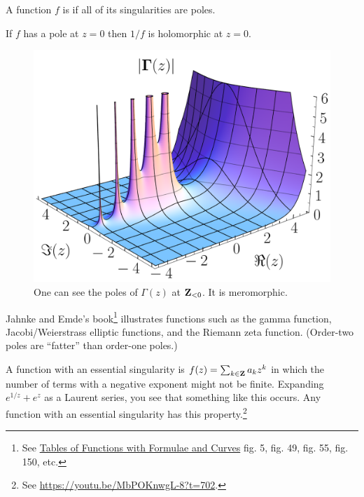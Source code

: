 \documentclass[11pt, oneside,margin=1in]{article}
\begin{document}
\begin{definition}[ ]\label{}\text{}
        A function $f$ is  if all of its singularities are poles.
\end{definition}

If $f$ has a pole at $z=0$ then $1/f$ is holomorphic at $z=0$.

\begin{figure}
	\begin{center}
		\includegraphics[scale=0.2]{abs_gamma}
		\caption{One can see the poles of $\Gamma(z)$ at $\mathbf Z_{<0}$. It is meromorphic.}
	\end{center}
\end{figure}

Jahnke and Emde's book\footnote{See \underline{Tables of Functions with Formulae and Curves} fig. 5, fig. 49, fig. 55, fig. 150, etc.} illustrates functions such as the gamma function, Jacobi/Weierstrass elliptic functions, and the Riemann zeta function. (Order-two poles are ``fatter'' than order-one poles.)

A function with an essential singularity is $f(z)=\sum_{k\in \mathbf Z}a_kz^k$ in which the number of terms with a negative exponent might not be finite. Expanding $e^{1/z} +e^z$ as a Laurent series, you see that something like this occurs. Any function with an essential singularity has this property.\footnote{See \url{https://youtu.be/MbPOKnwgL-8?t=702}.}
\end{document}
